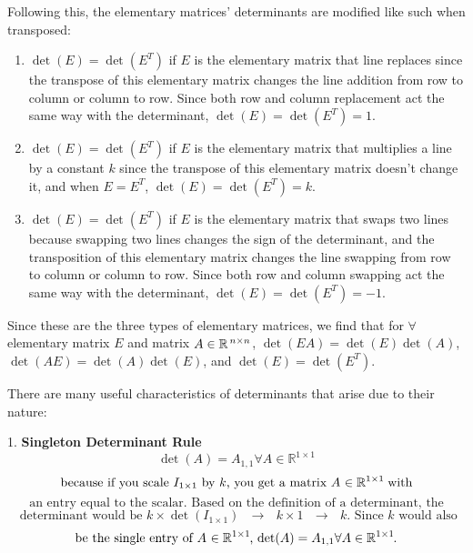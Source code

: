 \documentclass{article}
\begin{document}
Following this, the elementary matrices' determinants are modified like such when transposed:

\begin{enumerate}
    \item \(\det(E) = \det(E^T)\) if \(E\) is the elementary matrix that line replaces since the transpose of this elementary matrix changes the line addition from row to column or column to row. Since both row and column replacement act the same way with the determinant, \(\det(E) = \det(E^T) = 1\).
    \item \(\det(E) = \det(E^T)\) if \(E\) is the elementary matrix that multiplies a line by a constant \(k\) since the transpose of this elementary matrix doesn't change it, and when \(E = E^T\), \(\det(E) = \det(E^T) = k\).
    \item \(\det(E) = \det(E^T)\) if \(E\) is the elementary matrix that swaps two lines because swapping two lines changes the sign of the determinant, and the transposition of this elementary matrix changes the line swapping from row to column or column to row. Since both row and column swapping act the same way with the determinant, \(\det(E) = \det(E^T) = -1\).
\end{enumerate}

Since these are the three types of elementary matrices, we find that for $\forall$ elementary matrix $E$ and matrix $A \in \mathbb{R}^{\hspace{0.5mm}n \times n}$, \hspace{-0.5mm}$\det(EA) = \det(E)\det(A)$, $\det(AE) = \det(A)\det(E)$, and $\det(E) = \det(E^T)$.

\vspace{3mm}

There are many useful characteristics of determinants that arise due to their nature:
\vspace{3mm}


1. \textbf{Singleton Determinant Rule}
\[
\text{$\det(A) = A_{1,1} \forall A \in \mathbb{R}^{1 \times 1}$}
\]
\[
\text{because if you scale $I_{1 \times 1}$ by $k$, you get a matrix $A$ $\in \mathbb{R}^{1 \times 1}$\hspace{-0.25mm} with}
\]
\[
\text{an entry equal to the scalar. Based on the definition of a determinant, the}
\]
\[
\text{ determinant would be $k \times \det(I_{1 \times 1})$ $\rightarrow$ $k \times 1$ $\rightarrow$ $k$. Since $k$ would also}
\]
\[
\text{be the single entry of $A$ $\in \mathbb{R}^{1 \times 1}$\hspace{-0.25mm}, $\det(A) = A_{1,1} \forall A \in \mathbb{R}^{1 \times 1}$\hspace{-0.3mm}.}
\]
\end{document}
